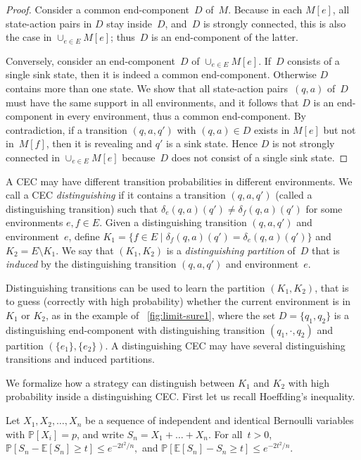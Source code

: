 \documentclass[a4paper,USenglish,cleveref, autoref, thm-restate]{lipics-v2021}
\newcommand*{\pr}{\mathbb{P}}
\newcommand*{\expect}{\mathbb{E}}
\begin{document}
\begin{proof}
	Consider a common end-component~$D$ of~$M$. Because in each $M[e]$, all state-action pairs in $D$
	stay inside~$D$, and~$D$ is strongly connected, this is also the case in $\cup_{e \in E} M[e]$;
	thus~$D$ is an end-component of the latter.

	Conversely, consider an end-component~$D$ of $\cup_{e \in E} M[e]$.	
	If~$D$ consists of a single sink state, then it is indeed
	a common end-component. Otherwise $D$ contains more than one state.
	We show that all state-action pairs~$(q,a)$ of~$D$ must have the same support in all environments,
	and it follows that $D$ is an end-component in every environment, thus a common end-component.
	By contradiction, if a transition $(q,a,q')$ with $(q,a) \in D$ exists in $M[e]$ but not in~$M[f]$,
	then it is revealing and $q'$ is a sink state. Hence $D$ is not strongly connected in $\cup_{e \in E} M[e]$
	because~$D$ does not consist of a single sink state. 
\end{proof}


A CEC may have different transition probabilities in different environments.
We call a CEC \emph{distinguishing} if it contains a transition $(q,a,q')$ (called a distinguishing transition) such that
$\delta_e(q,a)(q') \neq   \delta_{f}(q,a)(q')$
for some environments $e,f \in E$. 
Given a distinguishing transition $(q,a,q')$ and environment~$e$, define
$K_1 = \{f \in E \mid \delta_f(q,a)(q') = \delta_e(q,a)(q')\}$ and $K_2 = E \setminus K_1$.
We say that $(K_1,K_2)$ is a \emph{distinguishing partition} of~$D$ that is \emph{induced} by the distinguishing 
transition $(q,a,q')$ and environment~$e$.

Distinguishing transitions can be used to learn the partition $(K_1,K_2)$, that is to guess (correctly with high probability) whether the current environment is in $K_1$ or $K_2$, as in the example of \figurename~\ref{fig:limit-sure1}, where the set $D = \{q_1,q_2\}$ is a distinguishing end-component with distinguishing transition $(q_1,\cdot,q_2)$ and partition $(\{e_1\},\{e_2\})$. A distinguishing CEC may have several distinguishing transitions and induced partitions.


We formalize how a strategy can distinguish between $K_1$ and $K_2$ with high probability inside a distinguishing CEC.
First let us recall Hoeffding's inequality.

\begin{theorem}
	\label{thm:Hoeffding}
	Let $X_1,X_2,\ldots,X_n$ be a sequence of independent and identical Bernoulli variables with $\pr[X_i] = p$,
	and write $S_n = X_1+\ldots +X_n$. For all~$t> 0$,
	\(
		\pr[S_n - \expect[S_n] \geq t] \leq e^{-2t^2/n},
	\)
	and
	\(
		\pr[\expect[S_n] -S_n\geq t] \leq e^{-2t^2/n}.
	\)
\end{theorem}
\end{document}
